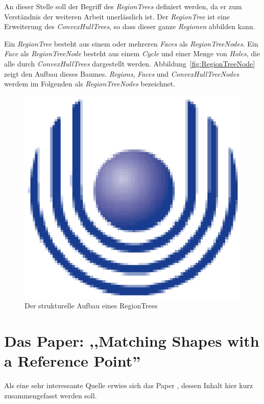 An dieser Stelle soll der Begriff des \textit{RegionTrees} definiert werden, da er zum Verständnis der weiteren Arbeit unerlässlich ist. Der \textit{RegionTree} ist eine Erweiterung des \textit{ConvexHullTrees}, so dass dieser ganze \textit{Regionen} abbilden kann. 

Ein \textit{RegionTree} besteht aus einem oder mehreren \textit{Faces} als \textit{RegionTreeNodes}. Ein \textit{Face} als \textit{RegionTreeNode} besteht aus einem \textit{Cycle} und einer Menge von \textit{Holes}, die alle durch \textit{ConvexHullTrees} dargestellt werden. Abbildung~\vref{fig:RegionTreeNode} zeigt den Aufbau dieses Baumes. \textit{Regions}, \textit{Faces} und \textit{ConvexHullTreeNodes} werdem im Folgenden als \textit{RegionTreeNodes} bezeichnet.

\begin{figure}
	\centering
	\includegraphics{feu_logo2.eps}
	\caption{Der strukturelle Aufbau eines RegionTrees}
	\label{fig:RegionTreeNode}
\end{figure}

\section[Matching Shapes with a Reference Point]{Das Paper: ,,Matching Shapes with a Reference Point'' }\label{AARR}

Als eine sehr interessante Quelle erwies sich das Paper \cite{AAR}, dessen Inhalt hier kurz zusammengefasst werden soll.

